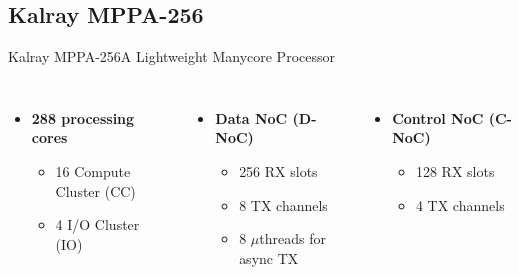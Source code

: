 	\subsection{Kalray MPPA-256}

		\begin{frame}[fragile]{Kalray MPPA-256}{A Lightweight Manycore Processor}


			\begin{columns}[totalwidth=\linewidth]


					\begin{itemize}
						\item \textbf{288 processing cores}
						\begin{itemize}
							\item {16 Compute Cluster (CC)}
							\item {4 I/O Cluster (IO)}
						\end{itemize}
					\end{itemize}

					\vspace{0.5cm}

					\begin{itemize}
						\item \textbf{Data NoC (D-NoC)}
						\begin{itemize}
							\item 256 RX slots
							\item 8 TX channels
							\item 8 $\mu$threads for async TX
						\end{itemize}
					\end{itemize}

					\vspace{0.5cm}

					\begin{itemize}
						\item \textbf{Control NoC (C-NoC)}
						\begin{itemize}
							\item 128 RX slots
							\item 4 TX channels
						\end{itemize}
					\end{itemize}

			\end{columns}

		\end{frame}


